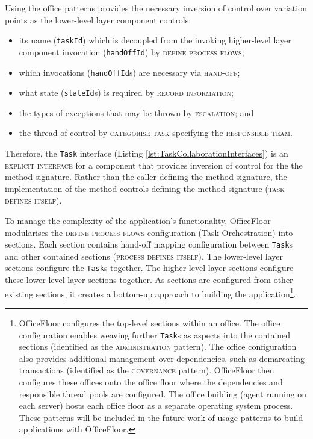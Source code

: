 \documentclass[prodmode]{style/acmlarge}
\begin{document}
Using the office patterns provides the necessary inversion of control over
variation points as the lower-level layer component controls:
\begin{itemize}
  \item its name (\texttt{taskId}) which is decoupled from the invoking higher-level layer component invocation (\texttt{handOffId}) by \textsc{define process flows};
  \item which invocations (\texttt{handOffId}s) are necessary via \textsc{hand-off};
  \item what state (\texttt{stateId}s) is required by \textsc{record information};
  \item the types of exceptions that may be thrown by \textsc{escalation}; and
  \item the thread of control by \textsc{categorise task} specifying the \textsc{responsible team}.
\end{itemize}

Therefore, the \texttt{Task} interface (Listing
\ref{lst:TaskCollaborationInterfaces}) is an \textsc{explicit interface} for a
component that provides inversion of control for the the method signature.
Rather than the caller defining the method signature, the implementation of the
method controls defining the method signature (\textsc{task defines itself}).

To manage the complexity of the application's functionality, OfficeFloor
modularises the \textsc{define process flows} configuration (Task Orchestration)
into sections.  Each section contains hand-off mapping configuration between
\texttt{Task}s and other contained sections (\textsc{process defines itself}).
The lower-level layer sections configure the \texttt{Task}s together.  The
higher-level layer sections configure these lower-level layer sections together.
As sections are configured from other existing sections, it creates a bottom-up
approach to building the application\footnote{OfficeFloor configures the
top-level sections within an office.  The office configuration enables weaving
further \texttt{Task}s as aspects into the contained sections (identified as the
\textsc{administration} pattern).  The office configuration also provides
additional management over dependencies, such as demarcating transactions
(identified as the \textsc{governance} pattern). OfficeFloor then configures
these offices onto the office floor where the dependencies and responsible
thread pools are configured.  The office building (agent running on each server)
hosts each office floor as a separate operating system process.  These patterns
will be included in the future work of usage patterns to build applications with
OfficeFloor.}.
\end{document}
